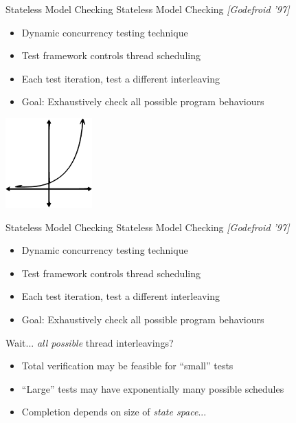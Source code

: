 \documentclass[xcolor=dvipsnames]{beamer}
\begin{document}
\begin{frame}{Stateless Model Checking}
	Stateless Model Checking {\em [Godefroid '97]}
	\begin{itemize}
		\item Dynamic concurrency testing technique
		\item Test framework controls thread scheduling
		\item Each test iteration, test a different interleaving
		\item Goal: Exhaustively check all possible program behaviours
	\end{itemize}
	\pause
	\linegap

	\begin{center}
	\includegraphics[width=0.25\textwidth]{exponential-curve.pdf}
	\end{center}
\end{frame}
\begin{frame}{Stateless Model Checking}
	Stateless Model Checking {\em [Godefroid '97]}
	\begin{itemize}
		\item Dynamic concurrency testing technique
		\item Test framework controls thread scheduling
		\item Each test iteration, test a different interleaving
		\item Goal: Exhaustively check all possible program behaviours
	\end{itemize}
	\linegap

	Wait... {\em all possible} thread interleavings?
	\begin{itemize}
		\item Total verification may be feasible for ``small'' tests
		\item ``Large'' tests may have exponentially many possible schedules
		\item Completion depends on size of {\em state space}...
	\end{itemize}
	\linegap

	\vspace{2.975em} %
\end{frame}
\end{document}
